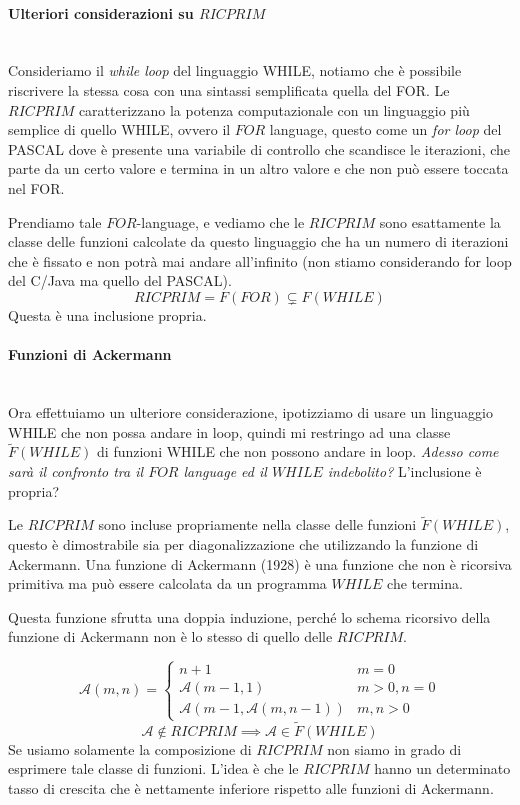 \documentclass{article}
\begin{document}
\paragraph{Ulteriori considerazioni su $RICPRIM$}\mbox{}\\
Consideriamo il \textit{while loop} del linguaggio WHILE, notiamo che è possibile riscrivere la stessa cosa
con una sintassi semplificata quella del FOR.
Le $RICPRIM$ caratterizzano la potenza computazionale con un linguaggio più semplice
di quello WHILE, ovvero il $FOR$ language, questo come un \textit{for loop} del PASCAL dove è presente
una variabile di controllo che scandisce le iterazioni, che parte da un certo valore
e termina in un altro valore e che non può essere toccata nel FOR.

Prendiamo tale $FOR$-language, e vediamo che le $RICPRIM$ sono esattamente la classe delle funzioni
calcolate da questo linguaggio che ha un numero di iterazioni che è fissato e non
potrà mai andare all'infinito (non stiamo considerando for loop del C/Java ma quello del PASCAL).
$$RICPRIM=F(FOR)\subsetneq F(WHILE)$$
Questa è una inclusione propria.

\paragraph{Funzioni di Ackermann}\mbox{}\\
Ora effettuiamo un ulteriore considerazione, ipotizziamo di usare un linguaggio WHILE
che non possa andare in loop, quindi mi restringo ad una classe $\tilde{F}(WHILE)$
di funzioni WHILE che non possono andare in loop. \textit{Adesso come sarà il
    confronto tra il $FOR$ language ed il $WHILE$ indebolito?} L'inclusione è propria?

Le $RICPRIM$ sono incluse propriamente nella classe delle funzioni $\tilde{F}(WHILE)$,
questo è dimostrabile sia per diagonalizzazione che utilizzando la funzione di Ackermann.
Una funzione di Ackermann (1928) è una funzione che non è ricorsiva primitiva ma
può essere calcolata da un programma $WHILE$ che termina.

Questa funzione sfrutta una doppia induzione, perché lo schema ricorsivo della funzione
di Ackermann non è lo stesso di quello delle $RICPRIM$.

\[
    \mathcal{A}(m,n)=
    \begin{cases}
        n+1                                 & m=0      \\
        \mathcal{A}(m-1,1)                  & m>0, n=0 \\
        \mathcal{A}(m-1,\mathcal{A}(m,n-1)) & m,n>0
    \end{cases}
\]
$$\mathcal{A}\notin RICPRIM\implies\mathcal{A}\in\tilde{F}(WHILE)$$
Se usiamo solamente la composizione di $RICPRIM$ non siamo in grado di esprimere tale
classe di funzioni. L'idea è che le $RICPRIM$ hanno un determinato tasso di crescita
che è nettamente inferiore rispetto alle funzioni di Ackermann.
\end{document}
